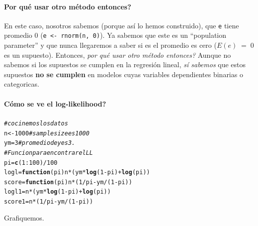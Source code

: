 \documentclass[onesided]{article}\usepackage[]{graphicx}\usepackage[]{color}
\makeatletter
\newcommand{\hlnum}[1]{\textcolor[rgb]{0.686,0.059,0.569}{#1}}%
\newcommand{\hlcom}[1]{\textcolor[rgb]{0.678,0.584,0.686}{\textit{#1}}}%
\newcommand{\hlopt}[1]{\textcolor[rgb]{0,0,0}{#1}}%
\newcommand{\hlstd}[1]{\textcolor[rgb]{0.345,0.345,0.345}{#1}}%
\newcommand{\hlkwa}[1]{\textcolor[rgb]{0.161,0.373,0.58}{\textbf{#1}}}%
\newcommand{\hlkwb}[1]{\textcolor[rgb]{0.69,0.353,0.396}{#1}}%
\newcommand{\hlkwc}[1]{\textcolor[rgb]{0.333,0.667,0.333}{#1}}%
\newcommand{\hlkwd}[1]{\textcolor[rgb]{0.737,0.353,0.396}{\textbf{#1}}}%
\newenvironment{kframe}{%
 \def\at@end@of@kframe{}%
 \ifinner\ifhmode%
  \def\at@end@of@kframe{\end{minipage}}%
  \begin{minipage}{\columnwidth}%
 \fi\fi%
 \def\FrameCommand##1{\hskip\@totalleftmargin \hskip-\fboxsep
 \colorbox{shadecolor}{##1}\hskip-\fboxsep
     \hskip-\linewidth \hskip-\@totalleftmargin \hskip\columnwidth}%
 \MakeFramed {\advance\hsize-\width
   \@totalleftmargin\z@ \linewidth\hsize
   \@setminipage}}%
 {\par\unskip\endMakeFramed%
 \at@end@of@kframe}
\newenvironment{knitrout}{}{} %
\makeatother
\begin{document}
\paragraph{Por qu\'e usar otro m\'etodo entonces?} En este caso, nosotros sabemos (porque as\'i lo hemos construido), que \texttt{e} tiene promedio 0 (\texttt{e  <- rnorm(n, 0)}). Ya sabemos que este es un ``population parameter'' y que nunca llegaremos a saber si es el promedio es cero ($E(e)\;=\;0$ es un supuesto). Entonces, \emph{por qu\'e usar otro m\'etodo entonces?} Aunque no sabemos si los supuestos se cumplen en la regresi\'on lineal, \emph{s\'i sabemos} que estos supuestos {\bf no se cumplen} en modelos cuyas variables dependientes binarias o categoricas.

\paragraph{C\'omo se ve el log-likelihood?} 

\begin{knitrout}
\color{fgcolor}\begin{kframe}
\begin{alltt}
\hlcom{# cocinemos los datos}
\hlstd{n} \hlkwb{<-} \hlnum{1000} \hlcom{# sample size es 1000}
\hlstd{ym} \hlkwb{=} \hlnum{3} \hlcom{# promedio de y es 3.}
\hlcom{# Funcion para encontrar el LL}
\hlstd{pi}\hlkwb{=}\hlkwd{c}\hlstd{(}\hlnum{1}\hlopt{:}\hlnum{100}\hlstd{)}\hlopt{/}\hlnum{100}
\hlstd{logl}\hlkwb{=}\hlkwa{function}\hlstd{(}\hlkwc{pi}\hlstd{) n}\hlopt{*}\hlstd{(ym}\hlopt{*}\hlkwd{log}\hlstd{(}\hlnum{1}\hlopt{-}\hlstd{pi)}\hlopt{+}\hlkwd{log}\hlstd{(pi))}
\hlstd{score}\hlkwb{=}\hlkwa{function}\hlstd{(}\hlkwc{pi}\hlstd{) n}\hlopt{*}\hlstd{(}\hlnum{1}\hlopt{/}\hlstd{pi}\hlopt{-}\hlstd{ym}\hlopt{/}\hlstd{(}\hlnum{1}\hlopt{-}\hlstd{pi))}
\hlstd{logl1}\hlkwb{=}\hlstd{n}\hlopt{*}\hlstd{(ym}\hlopt{*}\hlkwd{log}\hlstd{(}\hlnum{1}\hlopt{-}\hlstd{pi)}\hlopt{+}\hlkwd{log}\hlstd{(pi))}
\hlstd{score1}\hlkwb{=}\hlstd{n}\hlopt{*}\hlstd{(}\hlnum{1}\hlopt{/}\hlstd{pi}\hlopt{-}\hlstd{ym}\hlopt{/}\hlstd{(}\hlnum{1}\hlopt{-}\hlstd{pi))}
\end{alltt}
\end{kframe}
\end{knitrout}

Grafiquemos.
\end{document}
